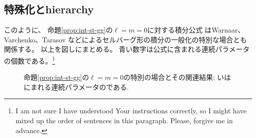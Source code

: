 \subsection{特殊化とhierarchy}
このように、
	命題\ref{prop:int-st-gg}の$\ell = m = 0$に対する積分公式
	はWarnaar、Varchenko、Tarasov などによるセルバーグ形の積分の一般化の特別な場合とも関係する。
	以上を図しにまとめる。
	{青}い{数字}は{公式}に{含}まれる連続パラメータの{個数}である。\footnote{I
	am not sure I have understood Your instructions correctly, so I might have mixed
up the order of sentences in this paragraph. Please, forgive me in advance.}
			\begin{figure*}[h]
				\centering
				\begin{tikzpicture}
				
				\end{tikzpicture}
				\caption{
					命題\ref{prop:int-st-gg}の$\ell=m=0$の特別の場合とその関連結果;
いはにまれる連続パラメータのである.
				}
				\label{fig:intdep}
			\end{figure*}
